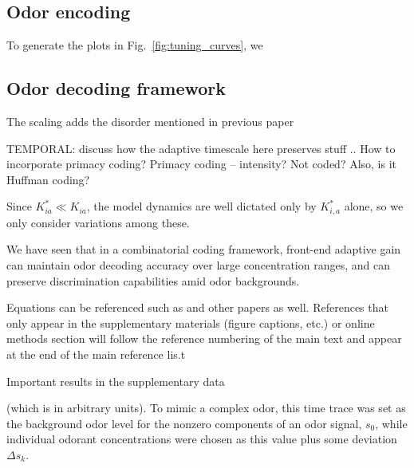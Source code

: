 \subsection{Odor encoding}
To generate the plots in Fig.~\ref{fig:tuning_curves}, we 

\subsection{Odor decoding framework}


The scaling adds the disorder mentioned in previous paper

TEMPORAL: discuss how the adaptive timescale here preserves stuff .. How to incorporate primacy coding?
Primacy coding -- intensity? Not coded? Also, is it Huffman coding?


Since $K^*_{ia} \ll K_{ia}$, the model dynamics are well dictated only by $K^*_{i, a}$ alone, so we only consider variations among these. 

We have seen that in a combinatorial coding framework, front-end adaptive gain can maintain odor decoding accuracy over large concentration ranges, and can preserve discrimination capabilities amid odor backgrounds. 


Equations can be referenced such as and other papers as well. References
that only appear in the supplementary materials (figure captions, etc.) or online methods section
will follow the reference numbering of the main text and appear at the end of the main reference
lis.t

Important results in the supplementary data

(which is in arbitrary units). To mimic a complex odor, this time trace was set as the background odor level for the nonzero components of an odor signal, $s_0$, while individual odorant concentrations were chosen as this value plus some deviation $\Delta s_k$.
